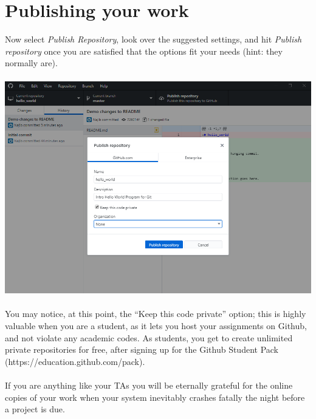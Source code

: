 \documentclass[12pt, letter]{article}
\begin{document}
    \section{Publishing your work}
    Now select \emph{Publish Repository}, look over the suggested settings, and hit \emph{Publish repository} once you are satisfied that the options fit your needs (hint: they normally are). \\ \\ %
    \includegraphics{screenshots/shot6.bmp}
    \\ \\
    You may notice, at this point, the ``Keep this code private'' option; this is highly valuable when you are a student, as it lets you host your assignments on Github, and not violate any academic codes. As students, you get to create unlimited private repositories for free, after signing up for the Github Student Pack (https://education.github.com/pack).
    \\ \\
    If you are anything like your TAs you will be eternally grateful for the online copies of your work when your system inevitably crashes fatally the night before a project is due.
\end{document}
